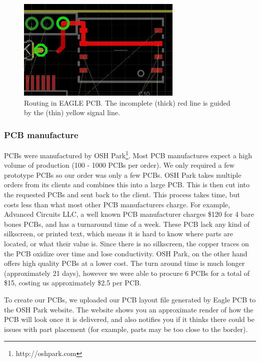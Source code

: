 \begin{figure}
\begin{center}
\includegraphics[width=0.7\textwidth]{images/Layout3.jpg}
\caption{Routing in EAGLE PCB. The incomplete (thick) red line is guided by the (thin) yellow signal line.}
\label{Fig:Layout3}
\end{center}
\end{figure}
\subsubsection{PCB manufacture}
PCBs were manufactured by OSH Park\footnote{http://oshpark.com}.
Most PCB manufactures expect a high volume of production (100 - 1000 PCBs per order).
We only required a few prototype PCBs so our order was only a few PCBs.
OSH Park takes multiple orders from its clients and combines this into a large PCB.
This is then cut into the requested PCBs and sent back to the client.
This process takes time, but costs less than what most other PCB manufacturers charge.
For example,
Advanced Circuits LLC,
a well known PCB manufacturer charges \$120 for 4 bare bones PCBs,
and has a turnaround time of a week.
These PCB lack any kind of silkscreen,
or printed text,
which means it is hard to know where parts are located,
or what their value is.
Since there is no silkscreen,
the copper traces on the PCB oxidize over time and lose conductivity.
OSH Park,
on the other hand offers high quality PCBs at a lower cost.
The turn around time is much longer (approximately 21 days),
however we were able to procure 6 PCBs for a total of \$15,
costing us approximately \$2.5 per PCB.

To create our PCBs, we uploaded our PCB layout file generated by Eagle PCB to the OSH Park website.
The website shows you an approximate render of how the PCB will look once it is delivered,
and also notifies you if it thinks there could be issues with part placement (for example, parts may be too close to the border).

